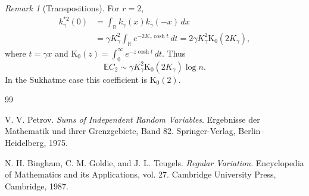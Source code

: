 \documentclass[11pt]{article}
\theoremstyle{remark}
\newtheorem{remark}[theorem]{Remark}
\newcommand{\Ee}{\mathbb E}
\newcommand{\dd}{\,d}
\begin{document}
\begin{remark}[Transpositions]
For $r=2$,
\[
\begin{aligned}
        k_\gamma^{*2}(0)
        &=\int_{\mathbb R}k_\gamma(x)k_\gamma(-x)\dd x\\
        &=\gamma K_\gamma^2
        \int_{\mathbb R}e^{-2K_\gamma\cosh t}\dd t
        =2\gamma K_\gamma^2\mathrm K_0(2K_\gamma),
\end{aligned}
\]
where $t=\gamma x$ and
$\mathrm K_0(z)=\int_0^\infty e^{-z\cosh t}\dd t$.  Thus
\[
        \Ee C_2\sim
        \gamma K_\gamma^2\mathrm K_0(2K_\gamma)\log n.
\]
In the Sukhatme case this coefficient is $\mathrm K_0(2)$.
\end{remark}


\begin{thebibliography}{99}

V. V. Petrov.
\newblock \emph{Sums of Independent Random Variables}.
\newblock Ergebnisse der Mathematik und ihrer Grenzgebiete, Band 82.
\newblock Springer-Verlag, Berlin--Heidelberg, 1975.

N. H. Bingham, C. M. Goldie, and J. L. Teugels.
\newblock \emph{Regular Variation}.
\newblock Encyclopedia of Mathematics and its Applications, vol. 27.
\newblock Cambridge University Press, Cambridge, 1987.

\end{thebibliography}
\end{document}
